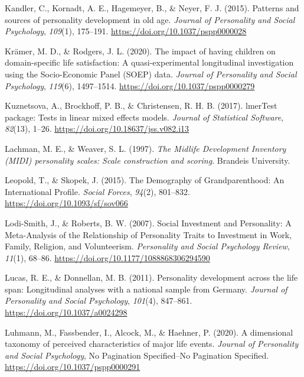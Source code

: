 \documentclass[
  english,
  man, noextraspace]{apa7}
\begin{document}
\leavevmode\hypertarget{ref-kandlerPatternsSourcesPersonality2015a}{}%
Kandler, C., Kornadt, A. E., Hagemeyer, B., \& Neyer, F. J. (2015). Patterns and sources of personality development in old age. \emph{Journal of Personality and Social Psychology}, \emph{109}(1), 175--191. \url{https://doi.org/10.1037/pspp0000028}

\leavevmode\hypertarget{ref-kramerImpactHavingChildren2020}{}%
Krämer, M. D., \& Rodgers, J. L. (2020). The impact of having children on domain-specific life satisfaction: A quasi-experimental longitudinal investigation using the Socio-Economic Panel (SOEP) data. \emph{Journal of Personality and Social Psychology}, \emph{119}(6), 1497--1514. \url{https://doi.org/10.1037/pspp0000279}

\leavevmode\hypertarget{ref-R-lmerTest}{}%
Kuznetsova, A., Brockhoff, P. B., \& Christensen, R. H. B. (2017). lmerTest package: Tests in linear mixed effects models. \emph{Journal of Statistical Software}, \emph{82}(13), 1--26. \url{https://doi.org/10.18637/jss.v082.i13}

\leavevmode\hypertarget{ref-lachmanMidlifeDevelopmentInventory1997}{}%
Lachman, M. E., \& Weaver, S. L. (1997). \emph{The Midlife Development Inventory (MIDI) personality scales: Scale construction and scoring}. Brandeis University.

\leavevmode\hypertarget{ref-leopoldDemographyGrandparenthoodInternational2015}{}%
Leopold, T., \& Skopek, J. (2015). The Demography of Grandparenthood: An International Profile. \emph{Social Forces}, \emph{94}(2), 801--832. \url{https://doi.org/10.1093/sf/sov066}

\leavevmode\hypertarget{ref-lodi-smithSocialInvestmentPersonality2007}{}%
Lodi-Smith, J., \& Roberts, B. W. (2007). Social Investment and Personality: A Meta-Analysis of the Relationship of Personality Traits to Investment in Work, Family, Religion, and Volunteerism. \emph{Personality and Social Psychology Review}, \emph{11}(1), 68--86. \url{https://doi.org/10.1177/1088868306294590}

\leavevmode\hypertarget{ref-lucasPersonalityDevelopmentLife2011}{}%
Lucas, R. E., \& Donnellan, M. B. (2011). Personality development across the life span: Longitudinal analyses with a national sample from Germany. \emph{Journal of Personality and Social Psychology}, \emph{101}(4), 847--861. \url{https://doi.org/10.1037/a0024298}

\leavevmode\hypertarget{ref-luhmannDimensionalTaxonomyPerceived2020}{}%
Luhmann, M., Fassbender, I., Alcock, M., \& Haehner, P. (2020). A dimensional taxonomy of perceived characteristics of major life events. \emph{Journal of Personality and Social Psychology}, No Pagination Specified--No Pagination Specified. \url{https://doi.org/10.1037/pspp0000291}
\end{document}
